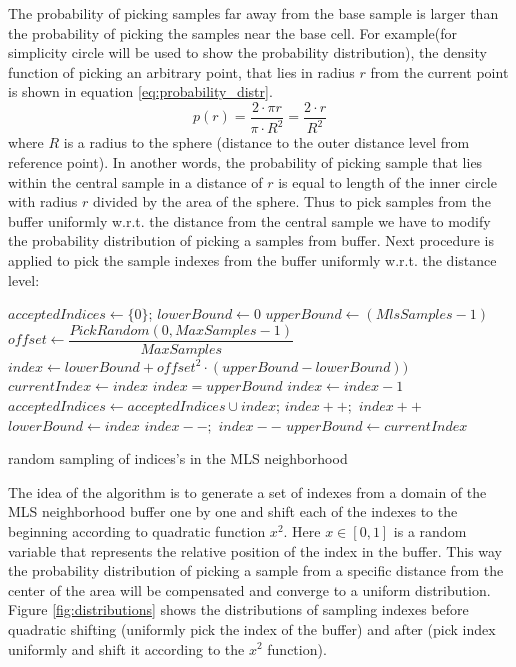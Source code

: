 The probability of picking samples far away from the base sample is larger than the probability of picking the samples near the base cell. For example(for simplicity circle will be used to show the probability distribution), the density function of picking an arbitrary point, that lies in radius $r$ from the current point is shown in equation \ref{eq:probability_distr}.
\begin{equation}
	p(r) = \dfrac{2 \cdot \pi r}{\pi \cdot R^2} = \dfrac{2 \cdot r}{R^2}
	\label{eq:probability_distr}
\end{equation}
where $R$ is a radius to the sphere (distance to the outer distance level from reference point). In another words, the probability of picking sample that lies within the central sample in a distance of $r$ is equal to length of the inner circle with radius $r$ divided by the area of the sphere. Thus to pick samples from the buffer uniformly w.r.t. the distance from the central sample we have to modify the probability distribution of picking a samples from buffer. Next procedure is applied to pick the sample indexes from the buffer uniformly w.r.t. the distance level:
\begin{algorithm}[H]
	\scriptsize
	\begin{algorithmic}
			\State $acceptedIndices \gets \{0\}$;
			\State $lowerBound \gets 0$
			\State $upperBound \gets (MlsSamples - 1)$
				\State $offset \gets \dfrac{PickRandom(0, MaxSamples - 1)}{MaxSamples}$
				\State $index \gets lowerBound + offset^2 \cdot (upperBound - lowerBound))$
				\State $currentIndex \gets index$
						\State $index = upperBound$
					\Else
						\State $index \gets index - 1$
					\EndIf
				\EndWhile
				\State $acceptedIndices \gets acceptedIndices \cup index$;
					\State $index++;$
						\State $index++$
					\EndWhile
					\State $lowerBound \gets index$
				\Else 
						\State $index--;$
							\State $index--$
						\EndWhile
						\State $upperBound \gets currentIndex$
					\EndIf
				\EndIf
			\EndFor
	\end{algorithmic}
	\caption{random sampling of indices's in the MLS neighborhood}
	\label{alg:mls_montecarlo_sampling}
\end{algorithm}
The idea of the algorithm is to generate a set of indexes from a domain of the MLS neighborhood buffer one by one and shift each of the indexes to the beginning according to quadratic function $x^2$. Here $x\in [0,1]$ is a random variable that represents the relative position of the index in the buffer. This way the probability distribution of picking a sample from a specific distance from the center of the area will be compensated and converge to a uniform distribution. Figure \ref{fig:distributions} shows the distributions of sampling indexes before quadratic shifting (uniformly pick the index of the buffer) and after (pick index uniformly and shift it according to the $x^2$ function).

